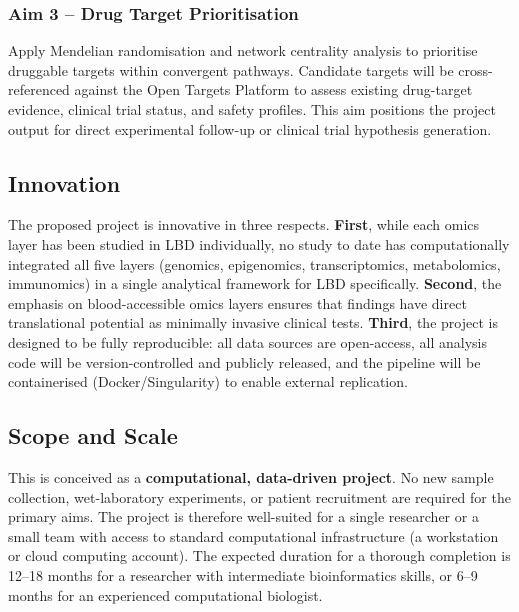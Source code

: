 \subsubsection*{Aim 3 -- Drug Target Prioritisation}
Apply Mendelian randomisation and network centrality analysis to prioritise druggable targets within convergent pathways. Candidate targets will be cross-referenced against the Open Targets Platform to assess existing drug-target evidence, clinical trial status, and safety profiles. This aim positions the project output for direct experimental follow-up or clinical trial hypothesis generation.

\subsection{Innovation}
The proposed project is innovative in three respects. \textbf{First}, while each omics layer has been studied in LBD individually, no study to date has computationally integrated all five layers (genomics, epigenomics, transcriptomics, metabolomics, immunomics) in a single analytical framework for LBD specifically. \textbf{Second}, the emphasis on blood-accessible omics layers ensures that findings have direct translational potential as minimally invasive clinical tests. \textbf{Third}, the project is designed to be fully reproducible: all data sources are open-access, all analysis code will be version-controlled and publicly released, and the pipeline will be containerised (Docker/Singularity) to enable external replication.

\subsection{Scope and Scale}
This is conceived as a \textbf{computational, data-driven project}. No new sample collection, wet-laboratory experiments, or patient recruitment are required for the primary aims. The project is therefore well-suited for a single researcher or a small team with access to standard computational infrastructure (a workstation or cloud computing account). The expected duration for a thorough completion is 12--18 months for a researcher with intermediate bioinformatics skills, or 6--9 months for an experienced computational biologist.
